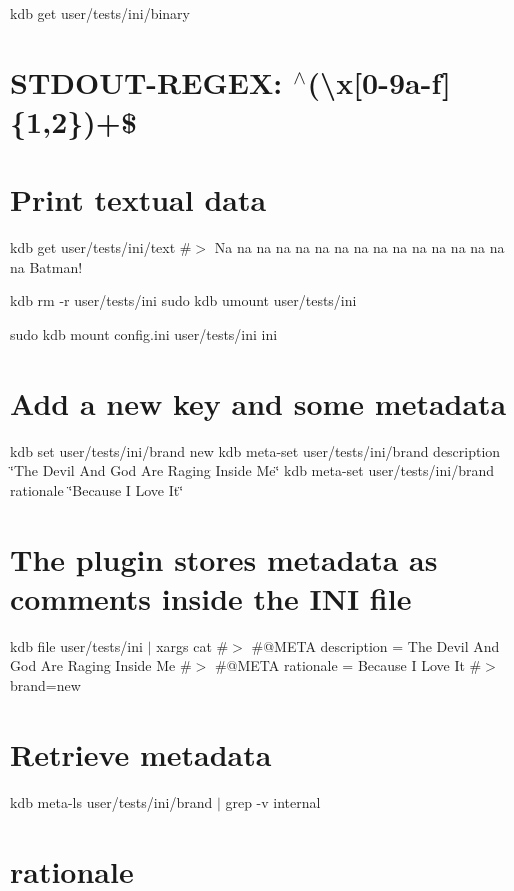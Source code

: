 kdb get user/tests/ini/binary \hypertarget{autotoc_md292_autotoc_md306}{}\section{S\+T\+D\+O\+U\+T-\/\+R\+E\+G\+E\+X\+: $^\wedge$(\textbackslash{}x\mbox{[}0-\/9a-\/f\mbox{]}\{1,2\})+\$}\label{autotoc_md292_autotoc_md306}
\hypertarget{autotoc_md292_autotoc_md307}{}\section{Print textual data}\label{autotoc_md292_autotoc_md307}
kdb get user/tests/ini/text \#$>$ Na na na na na na na na na na na na na na na na Batman!

kdb rm -\/r user/tests/ini sudo kdb umount user/tests/ini 
\begin{DoxyCode}{0}
\DoxyCodeLine{}
\end{DoxyCode}
 sudo kdb mount config.\+ini user/tests/ini ini\hypertarget{autotoc_md292_autotoc_md308}{}\section{Add a new key and some metadata}\label{autotoc_md292_autotoc_md308}
kdb set user/tests/ini/brand new kdb meta-\/set user/tests/ini/brand description \char`\"{}\+The Devil And God Are Raging Inside Me\char`\"{} kdb meta-\/set user/tests/ini/brand rationale \char`\"{}\+Because I Love It\char`\"{}\hypertarget{autotoc_md292_autotoc_md309}{}\section{The plugin stores metadata as comments inside the I\+N\+I file}\label{autotoc_md292_autotoc_md309}
kdb file user/tests/ini $\vert$ xargs cat \#$>$ \#@\+M\+E\+TA description = The Devil And God Are Raging Inside Me \#$>$ \#@\+M\+E\+TA rationale = Because I Love It \#$>$ brand=new\hypertarget{autotoc_md292_autotoc_md310}{}\section{Retrieve metadata}\label{autotoc_md292_autotoc_md310}
kdb meta-\/ls user/tests/ini/brand $\vert$ grep -\/v \textquotesingle{}internal\textquotesingle{} \hypertarget{autotoc_md292_autotoc_md311}{}\section{rationale}\label{autotoc_md292_autotoc_md311}
